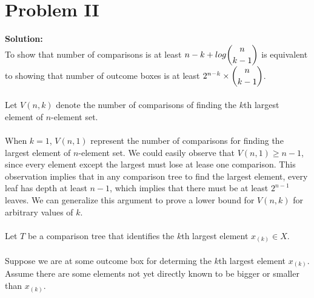 \section{Problem II}

\textbf{Solution:} \\
To show that number of comparisons is at least $n - k + log\dbinom{n}{k - 1}$ is equivalent to showing that number of outcome boxes is at least $2^{n - k} \times \dbinom{n}{k - 1}$.\\\\

Let $V(n, k)$ denote the number of comparisons of finding the $k$th largest element of $n$-element set. \\\\

When $k = 1$, $V(n, 1)$ represent the number of comparisons for finding the largest element of $n$-element set. We could easily observe that $V(n, 1) \geq n - 1$, since every element except the largest must lose at lease one comparison. This observation implies that in any comparison tree to find the largest element, every leaf has depth at least $n - 1$, which implies that there must be at least $2^{n - 1}$ leaves. We can generalize this argument to prove a lower bound for $V(n, k)$ for arbitrary values of $k$.\\\\

Let $T$ be a comparison tree that identifies the $k$th largest element $x_{(k)} \in X$.\\\\

Suppose we are at some outcome box for determing the $k$th largest element $x_{(k)}$. Assume there are some elements not yet directly known to be bigger or smaller than $x_{(k)}$. \\


